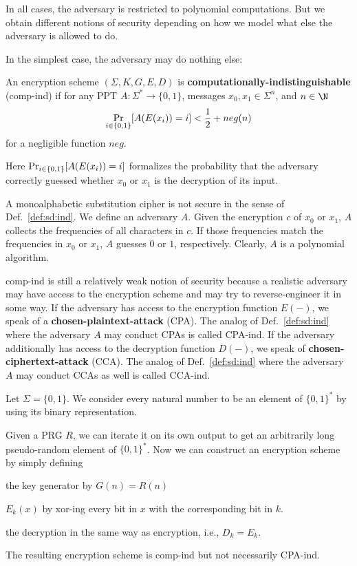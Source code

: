 In all cases, the adversary is restricted to polynomial computations.
But we obtain different notions of security depending on how we model what else the adversary is allowed to do.

In the simplest case, the adversary may do nothing else:

\begin{definition}\label{def:sd:ind}
  An encryption scheme $(\Sigma,K,G,E,D)$ is \textbf{computationally-indistinguishable} (comp-ind) if for any PPT $A:\Sigma^*\to\{0,1\}$, messages $x_0,x_1\in\Sigma^n$, and $n\in \N$
  \[\mathop{\mathrm{Pr}}_{i\in\{0,1\}}[A(E(x_i))=i]<\frac{1}{2}+neg(n)\]
  for a negligible function $neg$.
\end{definition}

Here $\mathop{\mathrm{Pr}}_{i\in\{0,1\}}[A(E(x_i))=i]$ formalizes the probability that the adversary correctly guessed whether $x_0$ or $x_1$ is the decryption of its input.

\begin{example}
A monoalphabetic substitution cipher is not secure in the sense of Def.~\ref{def:sd:ind}.
We define an adversary $A$.
Given the encryption $c$ of $x_0$ or $x_1$, $A$ collects the frequencies of all characters in $c$.
If those frequencies match the frequencies in $x_0$ or $x_1$, $A$ guesses $0$ or $1$, respectively.
Clearly, $A$ is a polynomial algorithm.
\end{example}

comp-ind is still a relatively weak notion of security because a realistic adversary may have access to the encryption scheme and may try to reverse-engineer it in some way.
If the adversary has access to the encryption function $E(-)$, we speak of a \textbf{chosen-plaintext-attack} (CPA).
The analog of Def.~\ref{def:sd:ind} where the adversary $A$ may conduct CPAs is called CPA-ind.
If the adversary additionally has access to the decryption function $D(-)$, we speak of \textbf{chosen-ciphertext-attack} (CCA).
The analog of Def.~\ref{def:sd:ind} where the adversary $A$ may conduct CCAs as well is called CCA-ind.

\begin{example}
Let $\Sigma=\{0,1\}$.
We consider every natural number to be an element of $\{0,1\}^*$ by using its binary representation.

Given a PRG $R$, we can iterate it on its own output to get an arbitrarily long pseudo-random element of $\{0,1\}^*$.
Now we can construct an encryption scheme by simply defining
\begin{compactitem}
 \item the key generator by $G(n)=R(n)$
 \item $E_k(x)$ by xor-ing every bit in $x$ with the corresponding bit in $k$.
 \item the decryption in the same way as encryption, i.e., $D_k=E_k$.
\end{compactitem}

The resulting encryption scheme is comp-ind but not necessarily CPA-ind.
\end{example}

